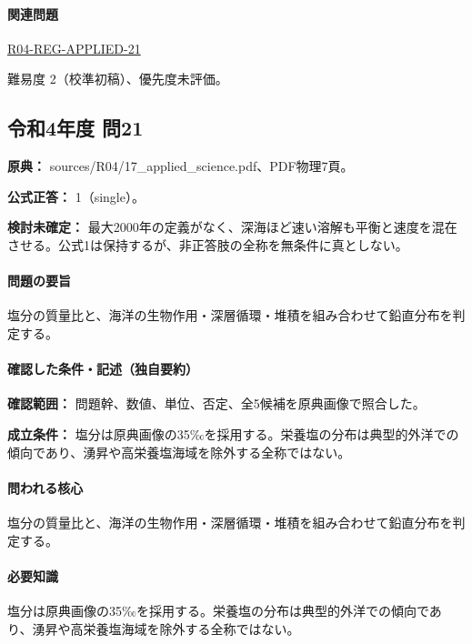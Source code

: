 \paragraph{関連問題} \hyperref[q:r04-reg-applied-21]{R04-REG-APPLIED-21}

\par 難易度 2（校準初稿）、優先度未評価。

\subsection{令和4年度 問21}
\label{q:r04-reg-applied-21}

\noindent\textbf{原典：} sources/R04/17\_applied\_science.pdf、PDF物理7頁。

\textbf{公式正答：} 1（single）。

\par\textbf{検討未確定：} 最大2000年の定義がなく、深海ほど速い溶解も平衡と速度を混在させる。公式1は保持するが、非正答肢の全称を無条件に真としない。

\paragraph{問題の要旨} 塩分の質量比と、海洋の生物作用・深層循環・堆積を組み合わせて鉛直分布を判定する。

\paragraph{確認した条件・記述（独自要約）}\mbox{}\par

\noindent\textbf{確認範囲：} 問題幹、数値、単位、否定、全5候補を原典画像で照合した。\par

\noindent\textbf{成立条件：} 塩分は原典画像の35‰を採用する。栄養塩の分布は典型的外洋での傾向であり、湧昇や高栄養塩海域を除外する全称ではない。\par

\paragraph{問われる核心} 塩分の質量比と、海洋の生物作用・深層循環・堆積を組み合わせて鉛直分布を判定する。

\paragraph{必要知識} 塩分は原典画像の35‰を採用する。栄養塩の分布は典型的外洋での傾向であり、湧昇や高栄養塩海域を除外する全称ではない。

